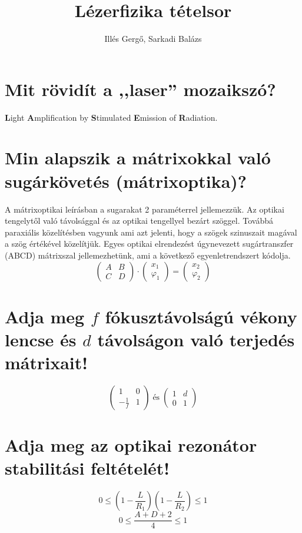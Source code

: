 \documentclass[12pt, a4paper]{article}
\title{\bfseries Lézerfizika tételsor}
\author{Illés Gergő, Sarkadi Balázs}
\begin{document}
\maketitle

\section{Mit rövidít a ,,laser'' mozaikszó?}
\textbf Light \textbf Amplification by \textbf Stimulated \textbf Emission of \textbf Radiation.

\section{Min alapszik a mátrixokkal való sugárkövetés (mátrixoptika)?}
A mátrixoptikai leírásban a sugarakat 2 paraméterrel jellemezzük. Az optikai tengelytől való távolsággal és az optikai tengellyel bezárt szöggel. Továbbá paraxiális közelítésben vagyunk ami azt jelenti, hogy a szögek szinuszait magával a szög értékével közelítjük. Egyes optikai elrendezést úgynevezett sugártranszfer (ABCD) mátrixszal jellemezhetünk, ami a következő egyenletrendszert kódolja.
\begin{equation}
\begin{pmatrix}
A&B\\C&D
\end{pmatrix}\cdot
\begin{pmatrix}
x_1\\\varphi_1
\end{pmatrix}=\begin{pmatrix}
x_2\\\varphi_2
\end{pmatrix}
\end{equation}

\section{Adja meg $f$ fókusztávolságú vékony lencse és $d$ távolságon való terjedés mátrixait!}
\begin{equation}
\begin{pmatrix}
1&0\\-\frac{1}{f}&1
\end{pmatrix}\;\text{és}\;
\begin{pmatrix}
1&d\\0&1
\end{pmatrix}
\end{equation}

\section{Adja meg az optikai rezonátor stabilitási feltételét!}
\begin{equation}
0\leq\left(1-\frac{L}{R_1}\right)\left(1-\frac{L}{R_2}\right)\leq 1
\end{equation}
\begin{equation}
0 \leq \frac{A+D+2}{4} \leq 1
\end{equation}
\end{document}
